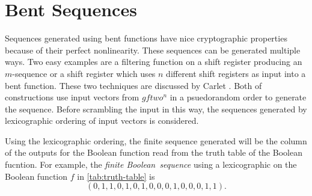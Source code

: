 \section{Bent Sequences}
\par Sequences generated using bent functions have nice cryptographic properties 
because of their perfect nonlinearity. These sequences can be generated multiple
ways. Two easy examples are a filtering function on a shift register producing
an $m$-sequence or a shift register which uses $n$ different shift registers as
input into a bent function. These two techniques are discussed by Carlet \cite{col:c06}.
Both of constructions use input vectors from $gftwo^n$ in a psuedorandom order
to generate the sequence. Before scrambling the input in this way, the sequences
generated by lexicographic ordering of input vectors is considered.

\par Using the lexicographic ordering, the finite sequence generated will be the column of
the outputs for the Boolean function read from the truth table of the Boolean fucntion.
For example, the {\em finite Boolean\ sequence} using a lexicographic on the Boolean function
$f$ in \ref{tab:truth-table} is
\[
(0,1,1,0,1,0,1,0,0,0,1,0,0,0,1,1).
\]

\par 
